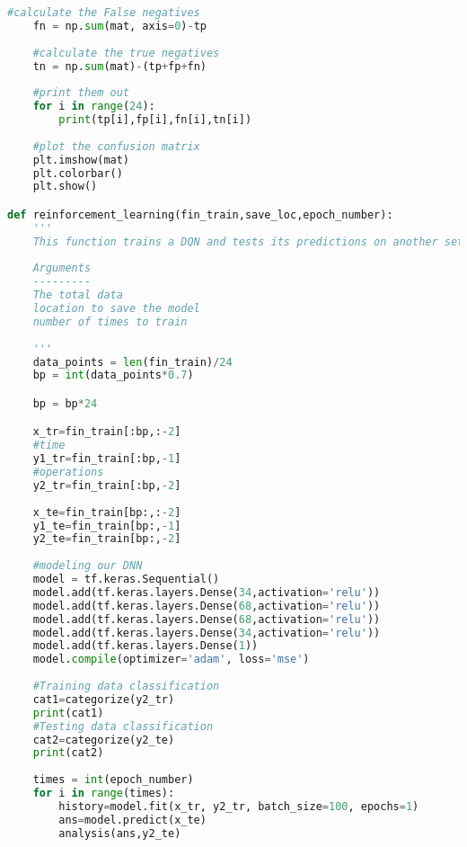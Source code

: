 \begin{lstlisting}[language=Python, caption=The code to train a DQN for the complex query, label={lst:DQN}]
    #calculate the False negatives
    fn = np.sum(mat, axis=0)-tp
    
    #calculate the true negatives
    tn = np.sum(mat)-(tp+fp+fn)
    
    #print them out
    for i in range(24):
        print(tp[i],fp[i],fn[i],tn[i])
    
    #plot the confusion matrix
    plt.imshow(mat)
    plt.colorbar()
    plt.show()

def reinforcement_learning(fin_train,save_loc,epoch_number):
    '''
    This function trains a DQN and tests its predictions on another set of data and returns the results found
    
    Arguments
    ---------
    The total data
    location to save the model
    number of times to train
    
    '''
    data_points = len(fin_train)/24
    bp = int(data_points*0.7)

    bp = bp*24

    x_tr=fin_train[:bp,:-2]
    #time
    y1_tr=fin_train[:bp,-1]
    #operations
    y2_tr=fin_train[:bp,-2]
    
    x_te=fin_train[bp:,:-2]
    y1_te=fin_train[bp:,-1]
    y2_te=fin_train[bp:,-2]
    
    #modeling our DNN
    model = tf.keras.Sequential()
    model.add(tf.keras.layers.Dense(34,activation='relu'))
    model.add(tf.keras.layers.Dense(68,activation='relu'))
    model.add(tf.keras.layers.Dense(68,activation='relu'))
    model.add(tf.keras.layers.Dense(34,activation='relu'))
    model.add(tf.keras.layers.Dense(1))
    model.compile(optimizer='adam', loss='mse')
    
    #Training data classification
    cat1=categorize(y2_tr)
    print(cat1)
    #Testing data classification
    cat2=categorize(y2_te)
    print(cat2)
    
    times = int(epoch_number)
    for i in range(times):
        history=model.fit(x_tr, y2_tr, batch_size=100, epochs=1)
        ans=model.predict(x_te)
        analysis(ans,y2_te)
\end{lstlisting}

